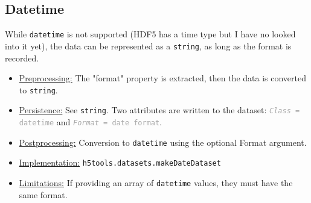 \documentclass[11pt]{exam}
\newcommand\myfcn[1]{\colorbox{codegray}{\textcolor{codeblue}{\texttt{#1}}}}
\newcommand\myatt[2]{\textcolor{darkgray}{\texttt{\textit{#1} = #2}}}
\begin{document}
        \subsection{Datetime}
        \noindent While \texttt{datetime} is not supported (HDF5 has a time type but I have no looked into it yet), the data can be represented as a \texttt{string}, as long as the format is recorded. 
        \noindent\begin{itemize}
            \item \underline{Preprocessing:} The "format" property is extracted, then the data is converted to \texttt{string}.
            \item \underline{Persistence:} See \texttt{string}. Two attributes are written to the dataset: \myatt{Class}{datetime} and \myatt{Format}{date format}.
            \item \underline{Postprocessing:} Conversion to \texttt{datetime} using the optional Format argument. 
            \item \underline{Implementation:} \myfcn{h5tools.datasets.makeDateDataset}
            \item \underline{Limitations:} If providing an array of \texttt{datetime} values, they must have the same format.  
        \end{itemize}
        
\end{document}
